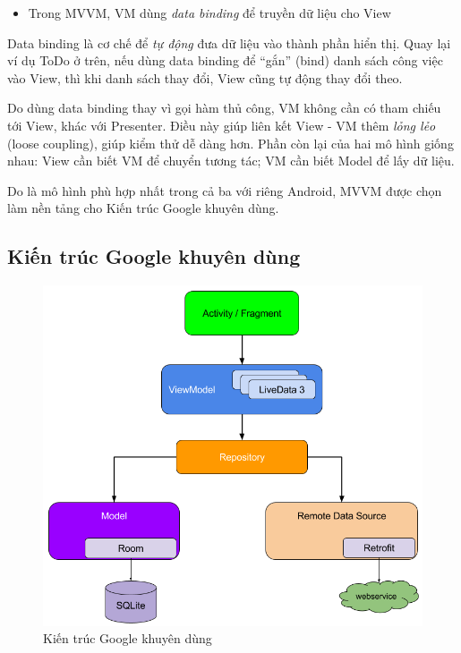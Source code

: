 \documentclass[../../thesis]{subfiles}
\begin{document}
\begin{itemize}[resume, before = \vspace*{-\dimexpr\topsep+\partopsep\relax}]
    \item
          Trong MVVM, VM dùng \emph{data binding} để truyền dữ liệu cho View
\end{itemize}

Data binding là cơ chế để \emph{tự động} đưa dữ liệu vào thành phần hiển thị.
Quay lại ví dụ ToDo ở trên, nếu dùng data binding để ``gắn'' (bind) danh sách
công việc vào View, thì khi danh sách thay đổi, View cũng tự động thay đổi theo.

Do dùng data binding thay vì gọi hàm thủ công, VM không cần có tham chiếu tới
View, khác với Presenter. Điều này giúp liên kết View - VM thêm \emph{lỏng lẻo}
(loose coupling), giúp kiểm thử dễ dàng hơn. Phần còn lại của hai mô hình giống
nhau: View cần biết VM để chuyển tương tác; VM cần biết Model để lấy dữ liệu.

Do là mô hình phù hợp nhất trong cả ba với riêng Android, MVVM được chọn làm nền
tảng cho Kiến trúc Google khuyên dùng.

\subsection{Kiến trúc Google khuyên dùng}\label{sec:app-arch}

\begin{figure}
    \centering
    \vspace*{-8mm}
    \includegraphics[width=\linewidth]{../images/final-architecture.png}
    \vspace*{-10mm}
    \caption{Kiến trúc Google khuyên dùng \cite{GOOGL_APP_ARCH}}
    \label{fig:google-recom-arch}
\end{figure}
\end{document}
